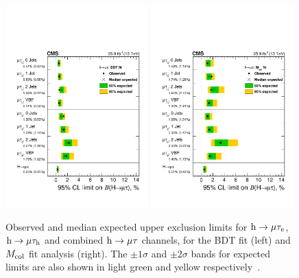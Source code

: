 \begin{figure}[!htpb]\centering
 \includegraphics[width=0.49\textwidth]{plots_and_figures/chapter8/h125/brazilflagBDT.pdf}
 \includegraphics[width=0.49\textwidth]{plots_and_figures/chapter8/h125/brazilflagmcol.pdf} \\
 \caption{Observed and median expected upper exclusion limits for $\text{h} \to \mu \tau_{e}$, $\text{h} \to \mu \tau_{\text{h}}$ and combined $\text{h} \to \mu \tau$ channels, for the BDT fit (left) and $M_{\text{col}}$ fit analysis (right). The $\pm 1 \sigma$ and $\pm 2 \sigma$ bands for expected limits are also shown in light green and yellow respectively~\cite{HIG-17-001}.}
 \label{fig:hmue_limits_brazil}
\end{figure}

